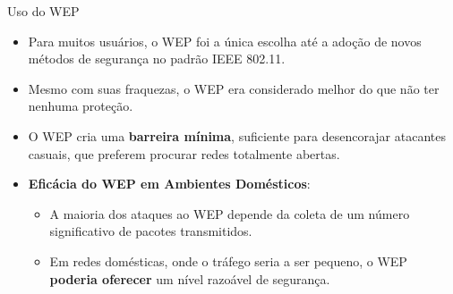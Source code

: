 \begin{frame}{Uso do WEP}
    \begin{itemize}
        \item Para muitos usuários, o WEP foi a única escolha até a adoção de novos métodos de segurança no padrão IEEE 802.11.
        \item Mesmo com suas fraquezas, o WEP era considerado melhor do que não ter nenhuma proteção.
        \item O WEP cria uma \textbf{barreira mínima}, suficiente para desencorajar atacantes casuais, que preferem procurar redes totalmente abertas.
    \end{itemize}

    \begin{itemize}
        \item \textbf{Eficácia do WEP em Ambientes Domésticos}:
              \begin{itemize}
                  \item A maioria dos ataques ao WEP depende da coleta de um número significativo de pacotes transmitidos.
                  \item Em redes domésticas, onde o tráfego seria a ser pequeno, o WEP \textbf{poderia oferecer} um nível razoável de segurança.

              \end{itemize}

    \end{itemize}


\end{frame}



